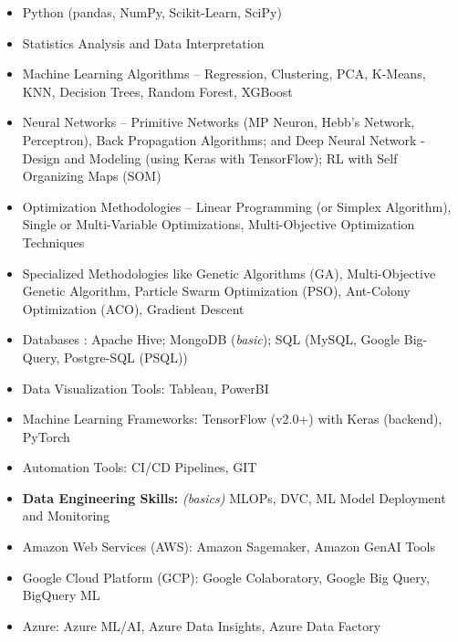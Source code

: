 
%




\begin{multicols}{2}
	\begin{itemize}
		\item Python (pandas, NumPy, Scikit-Learn, SciPy)
		\item Statistics Analysis and Data Interpretation
		\item Machine Learning Algorithms – Regression, Clustering, PCA, K-Means, KNN, Decision Trees, Random Forest, XGBoost
		\item Neural Networks – Primitive Networks (MP Neuron, Hebb’s Network, Perceptron), Back Propagation Algorithms; and Deep Neural Network - Design and Modeling (using Keras with TensorFlow); RL with Self Organizing Maps (SOM)
		\item Optimization Methodologies – Linear Programming (or Simplex Algorithm), Single or Multi-Variable Optimizations, Multi-Objective Optimization Techniques
		\item \nohyphens{Specialized Methodologies like Genetic Algorithms (GA), Multi-Objective Genetic Algorithm, Particle Swarm Optimization (PSO), Ant-Colony Optimization (ACO), Gradient Descent}
		\item Databases : Apache Hive; MongoDB (\textit{basic}); SQL (MySQL, Google Big-Query, Postgre-SQL (PSQL))
		\item Data Visualization Tools: Tableau, PowerBI
        \item Machine Learning Frameworks: TensorFlow (v2.0+) with Keras (backend), PyTorch
        \item Automation Tools: CI/CD Pipelines, GIT
		\item \textbf{Data Engineering Skills:} \textit{(basics)} MLOPs, DVC, ML Model Deployment and Monitoring
	\end{itemize}

    \begin{itemize}
        \item Amazon Web Services (AWS): Amazon Sagemaker, Amazon GenAI Tools
        \item Google Cloud Platform (GCP): Google Colaboratory, Google Big Query, BigQuery ML
        \item Azure: Azure ML/AI, Azure Data Insights, Azure Data Factory
    \end{itemize}


\end{multicols}
